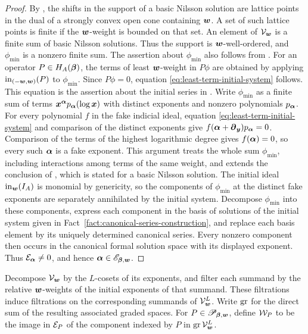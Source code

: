 \begin{proof}
	By \cite[Definition~2.6]{DMM12}, the shifts in the support of a basic Nilsson solution are lattice points in the dual of a strongly convex open cone containing \(\boldsymbol{w}\).
	A set of such lattice points is finite if the \(\boldsymbol{w}\)-weight is bounded on that set.
	An element of \(\mathcal V_{\boldsymbol{w}}\) is a finite sum of basic Nilsson solutions.
	Thus the support is \(\boldsymbol{w}\)-well-ordered, and \(\phi_{\min}\) is a nonzero finite sum.
	The assertion about \(\phi_{\min}\) also follows from \cite[Proposition~2.5.2]{SST00}.
	For an operator \(P\in H_A(\boldsymbol{\beta})\), the terms of least \(\boldsymbol{w}\)-weight in \(P\phi\) are obtained by applying \(\operatorname{in}_{(-\boldsymbol{w},\boldsymbol{w})}(P)\) to \(\phi_{\min}\).
	Since \(P\phi=0\), equation \eqref{eq:least-term-initial-system} follows.
	This equation is the assertion about the initial series in \cite[Theorem~2.5.5]{SST00}.
	Write \(\phi_{\min}\) as a finite sum of terms \(\boldsymbol{x}^{\boldsymbol{\alpha}}p_{\boldsymbol{\alpha}}(\log\boldsymbol{x})\) with distinct exponents and nonzero polynomials \(p_{\boldsymbol{\alpha}}\).
	For every polynomial \(f\) in the fake indicial ideal, equation \eqref{eq:least-term-initial-system} and comparison of the distinct exponents give \(f(\boldsymbol{\alpha}+\boldsymbol{\partial}_{\boldsymbol{y}})p_{\boldsymbol{\alpha}}=0\).
	Comparison of the terms of the highest logarithmic degree gives \(f(\boldsymbol{\alpha})=0\), so every such \(\boldsymbol{\alpha}\) is a fake exponent.
	This argument treats the whole sum \(\phi_{\min}\), including interactions among terms of the same weight, and extends the conclusion of \cite[Lemma~2.10]{DMM12}, which is stated for a basic Nilsson solution.
	The initial ideal \(\operatorname{in}_{\boldsymbol w}(I_A)\) is monomial by genericity, so the components of \(\phi_{\min}\) at the distinct fake exponents are separately annihilated by the initial system.
	Decompose \(\phi_{\min}\) into these components, express each component in the basis of solutions of the initial system given in Fact~\ref{fact:canonical-series-construction}, and replace each basis element by its uniquely determined canonical series.
	Every nonzero component then occurs in the canonical formal solution space with its displayed exponent.
	Thus \(\mathcal E_{\boldsymbol{\alpha}}\ne0\), and hence \(\boldsymbol{\alpha}\in\mathscr E_{\boldsymbol{\beta},\boldsymbol{w}}\).
\end{proof}

Decompose \(\mathcal V_{\boldsymbol{w}}\) by the \(L\)-cosets of its exponents, and filter each summand by the relative \(\boldsymbol{w}\)-weights of the initial exponents of that summand.
These filtrations induce filtrations on the corresponding summands of \(\mathcal V_{\boldsymbol{w}}^{L}\).
Write \(\operatorname{gr}\) for the direct sum of the resulting associated graded spaces.
For \(P\in\mathscr P_{\boldsymbol{\beta},\boldsymbol{w}}\), define \(\mathcal W_P\) to be the image in \(\mathcal E_P\) of the component indexed by \(P\) in \(\operatorname{gr}\mathcal V_{\boldsymbol{w}}^{L}\).

